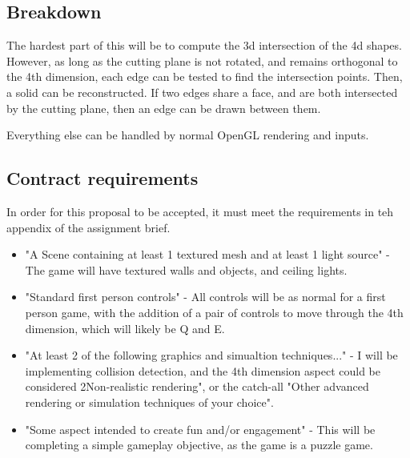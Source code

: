 \documentclass[12pt]{article}
\begin{document}
\subsection{Breakdown}
The hardest part of this will be to compute the 3d intersection of the 4d shapes.
However, as long as the cutting plane is not rotated, and remains orthogonal to the 4th dimension, each edge can be tested to find the intersection points.
Then, a solid can be reconstructed. If two edges share a face, and are both intersected by the cutting plane, then an edge can be drawn between them.

Everything else can be handled by normal OpenGL rendering and inputs.

\subsection{Contract requirements}
In order for this proposal to be accepted, it must meet the requirements in teh appendix of the assignment brief.
\begin{itemize}
    \item "A Scene containing at least 1 textured mesh and at least 1 light source" - The game will have textured walls and objects, and ceiling lights.
    \item "Standard first person controls" - All controls will be as normal for a first person game, with the addition of a pair of controls to move through the 4th dimension, which will likely be Q and E.
    \item "At least 2 of the following graphics and simualtion techniques..." - I will be implementing collision detection, and the 4th dimension aspect could be considered 2Non-realistic rendering", or the catch-all "Other advanced rendering or simulation techniques of your choice".
    \item "Some aspect intended to create fun and/or engagement" - This will be completing a simple gameplay objective, as the game is a puzzle game.
\end{itemize}
\end{document}
